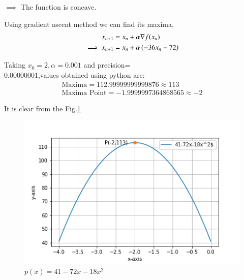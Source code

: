 \documentclass[journal,12pt,twocolumn]{IEEEtran}
\begin{document}
$\implies$
The function is concave.

Using gradient ascent method we can find its maxima,
    \begin{align}
        x_{n+1} &= x_n + \alpha \nabla f(x_n) \\
        \implies x_{n+1} &= x_n + \alpha \left(-36x_n-72\right)
    \end{align}
    
    Taking $x_0=2,\alpha=0.001$ and precision= \\ 0.00000001,values obtained using python are:
    \begin{align}
        \boxed{\text{Maxima} =112.99999999999876 \approx 113 }\\
        \boxed{\text{Maxima Point} =  -1.9999997364868565\approx -2}
    \end{align}

It is clear from the Fig.\ref{p(x)}
\begin{figure}[!ht]
    \centering
    \includegraphics[width=\columnwidth]{assignment14.png}
    \caption{$p(x)=41-72x-18x^2$}
    \label{p(x)}	
\end{figure}
\end{document}
